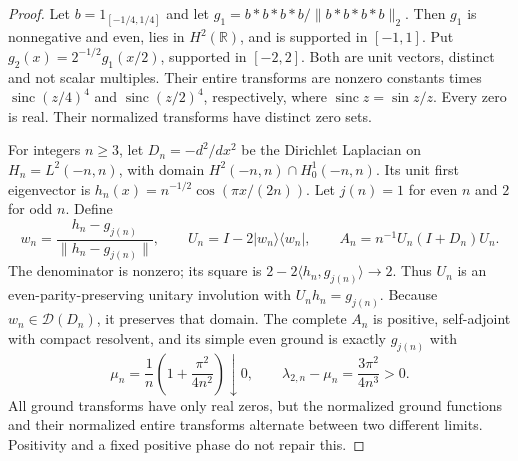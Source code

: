 \begin{proof}
Let $b=1_{[-1/4,1/4]}$ and let $g_1=b*b*b*b/\|b*b*b*b\|_2$.
Then $g_1$ is nonnegative and even, lies in $H^2(\mathbb R)$, and is
supported in $[-1,1]$. Put $g_2(x)=2^{-1/2}g_1(x/2)$, supported in
$[-2,2]$. Both are unit vectors, distinct and not scalar multiples.
Their entire transforms are nonzero constants times
$\operatorname{sinc}(z/4)^4$ and $\operatorname{sinc}(z/2)^4$,
respectively, where $\operatorname{sinc}z=\sin z/z$. Every zero is real.
Their normalized transforms have distinct zero sets.

For integers $n\ge3$, let $D_n=-d^2/dx^2$ be the Dirichlet Laplacian
on $H_n=L^2(-n,n)$, with domain $H^2(-n,n)\cap H_0^1(-n,n)$.
Its unit first eigenvector is
$h_n(x)=n^{-1/2}\cos(\pi x/(2n))$.
Let $j(n)=1$ for even $n$ and $2$ for odd $n$. Define
\[
 w_n=\frac{h_n-g_{j(n)}}{\|h_n-g_{j(n)}\|},\qquad
 U_n=I-2|w_n\rangle\langle w_n|,\qquad
 A_n=n^{-1}U_n(I+D_n)U_n.
\]
The denominator is nonzero; its square is
$2-2\langle h_n,g_{j(n)}\rangle\to2$.
Thus $U_n$ is an even-parity-preserving unitary involution with
$U_nh_n=g_{j(n)}$. Because $w_n\in\mathcal D(D_n)$, it preserves
that domain. The complete $A_n$ is positive, self-adjoint with compact
resolvent, and its simple even ground is exactly $g_{j(n)}$ with
\[
 \mu_n=\frac1n\left(1+\frac{\pi^2}{4n^2}\right)\downarrow0,
 \qquad \lambda_{2,n}-\mu_n=\frac{3\pi^2}{4n^3}>0.
\]
All ground transforms have only real zeros, but the normalized ground
functions and their normalized entire transforms alternate between two
different limits. Positivity and a fixed positive phase do not repair this.


\end{proof}
